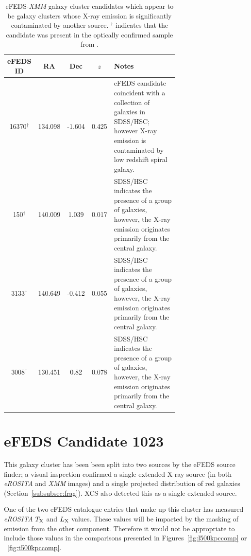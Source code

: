 \documentclass[fleqn,usenatbib]{mnras}
\begin{document}
\begin{table}
\begin{center}
\caption[]{{eFEDS-{\em XMM} galaxy cluster candidates which appear to be galaxy clusters whose X-ray emission is significantly contaminated by another source. \newline $^\dagger$ indicates that the candidate was present in the optically confirmed sample from \cite{efedsclusteropticalcat}.}\label{tab:taintedxray}}
\vspace{-5mm}
\begin{tabular}{cccc|p{0.70\linewidth}}
\hline
\hline
eFEDS ID & RA & Dec & $z$ & Notes\\
\hline
\hline
16370$^\dagger$ & 134.098 & -1.604 & 0.425 & eFEDS candidate coincident with a collection of galaxies in SDSS/HSC; however X-ray emission is contaminated by low redshift spiral galaxy. \\ 
\hline
150$^\dagger$ & 140.009 & 1.039 & 0.017 & SDSS/HSC indicates the presence of a group of galaxies, however, the X-ray emission originates primarily from the central galaxy. \\ 
\hline
3133$^\dagger$ & 140.649 & -0.412 & 0.055 & SDSS/HSC indicates the presence of a group of galaxies, however, the X-ray emission originates primarily from the central galaxy. \\ 
\hline
3008$^\dagger$ & 130.451 & 0.82 & 0.078 & SDSS/HSC indicates the presence of a group of galaxies, however, the X-ray emission originates primarily from the central galaxy. \\ 
\hline
\end{tabular}
\end{center}
\end{table}

\section{\lowercase{e}FEDS Candidate 1023}
\label{app:split_cluster}

This galaxy cluster has been been split into two sources by the eFEDS source finder; a visual inspection confirmed a single extended X-ray source (in both {\em eROSITA} and {\em XMM} images) and a single projected distribution of red galaxies (Section~\ref{subsubsec:frag}). XCS also detected this as a single extended source.

One of the two eFEDS catalogue entries that make up this cluster has measured {\em eROSITA} $T_{\rm{X}}$ and $L_{\rm{X}}$ values. These values will be impacted by the masking of emission from the other component. Therefore it would not be appropriate to include those values in the comparisons presented in Figures~\ref{fig:l500kpccomp} or ~\ref{fig:t500kpccomp}.
\end{document}
